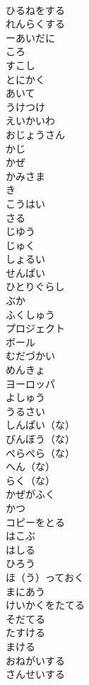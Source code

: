 \documentclass[8pt]{extreport}
\begin{document}
\begin{CJK}{UTF8}{min}
\\	ひるねをする	
\\	れんらくする	
\\	ーあいだに	
\\	ころ	
\\	すこし	
\\	とにかく	
\\	あいて	
\\	うけつけ	
\\	えいかいわ	
\\	おじょうさん	
\\	かじ	
\\	かぜ	
\\	かみさま	
\\	き	
\\	こうはい	
\\	さる	
\\	じゆう	
\\	じゅく	
\\	しょるい	
\\	せんぱい	
\\	ひとりぐらし	
\\	ぶか	
\\	ふくしゅう	
\\	プロジェクト	
\\	ボール	
\\	むだづかい	
\\	めんきょ	
\\	ヨーロッパ	
\\	よしゅう	
\\	うるさい	
\\	しんぱい（な）	
\\	びんぼう（な）	
\\	ぺらぺら（な）	
\\	へん（な）	
\\	らく（な）	
\\	かぜがふく	
\\	かつ	
\\	コピーをとる	
\\	はこぶ	
\\	はしる	
\\	ひろう	
\\	ほ（う）っておく	
\\	まにあう	
\\	けいかくをたてる	
\\	そだてる	
\\	たすける	
\\	まける	
\\	おねがいする	
\\	さんせいする	

\end{CJK}
\end{document}

